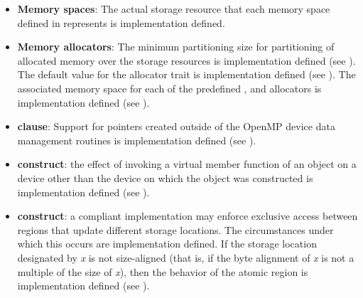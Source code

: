 \begin{itemize}

\item \textbf{Memory spaces}: The actual storage resource that each memory 
      space defined in  represents is 
      implementation defined.
\item \textbf{Memory allocators}: The minimum partitioning size for partitioning 
      of allocated memory over the storage resources is implementation defined 
      (see ). The default value for the 
       allocator trait is implementation defined (see 
      ). The associated memory space for each of 
      the predefined ,  
      and  allocators is implementation defined 
      (see ).
\item {} \textbf{clause}: Support for pointers created outside 
      of the OpenMP device data management routines is implementation defined 
      (see ).
\item {} \textbf{construct}: the effect of invoking a virtual member
      function of an object on a device other than the device on which the object 
      was constructed is implementation defined (see 
      ).
\item {} \textbf{construct}: a compliant implementation may enforce 
      exclusive access 
      between  regions that update different storage locations. 
      The circumstances under which this occurs are implementation defined. 
      If the storage location designated by \emph{x} is not size-aligned (that 
      is, if the byte alignment of \emph{x} is not a multiple of the size of 
      \emph{x}), then the behavior of the atomic region is implementation 
      defined (see ).


\end{itemize}
